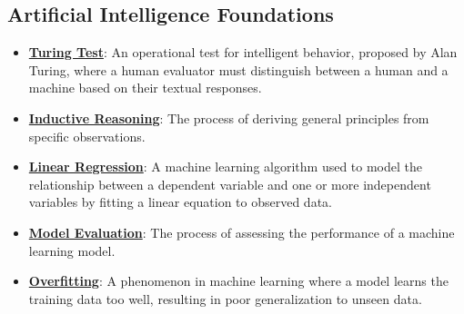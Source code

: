 \documentclass{article}%
\begin{document}
\subsection{Artificial Intelligence Foundations}%
\label{subsec:ArtificialIntelligenceFoundations}%
\begin{itemize}[leftmargin=*]%
\item \href{https://purdue.brightspace.com/d2l/common/assets/pdfjs-d2l-dist/1.0.14-legacy/web/viewer.html?file=\%2Fcontent\%2Fenforced\%2F1095467-wl.202510.CS.24300.001\%2F02L2-Intro.pdf\%3Fou\%3D1095467\&lang=en-us\&container=d2l-fileviewer-rendered-pdf\&fullscreen=d2l-fileviewer-rendered-pdf-dialog\&height=667#page=6}{\textbf{Turing Test}}: An operational test for intelligent behavior, proposed by Alan Turing, where a human evaluator must distinguish between a human and a machine based on their textual responses.%
\item \href{https://purdue.brightspace.com/d2l/common/assets/pdfjs-d2l-dist/1.0.14-legacy/web/viewer.html?file=\%2Fcontent\%2Fenforced\%2F1095467-wl.202510.CS.24300.001\%2F05L2-ML Basics.pdf\%3Fou\%3D1095467\&lang=en-us\&container=d2l-fileviewer-rendered-pdf\&fullscreen=d2l-fileviewer-rendered-pdf-dialog\&height=667#page=3}{\textbf{Inductive Reasoning}}: The process of deriving general principles from specific observations.%
\item \href{https://purdue.brightspace.com/d2l/common/assets/pdfjs-d2l-dist/1.0.14-legacy/web/viewer.html?file=\%2Fcontent\%2Fenforced\%2F1095467-wl.202510.CS.24300.001\%2F05L2-ML Basics.pdf\%3Fou\%3D1095467\&lang=en-us\&container=d2l-fileviewer-rendered-pdf\&fullscreen=d2l-fileviewer-rendered-pdf-dialog\&height=667#page=6}{\textbf{Linear Regression}}: A machine learning algorithm used to model the relationship between a dependent variable and one or more independent variables by fitting a linear equation to observed data.%
\item \href{https://purdue.brightspace.com/d2l/common/assets/pdfjs-d2l-dist/1.0.14-legacy/web/viewer.html?file=\%2Fcontent\%2Fenforced\%2F1095467-wl.202510.CS.24300.001\%2F05L2-ML Basics.pdf\%3Fou\%3D1095467\&lang=en-us\&container=d2l-fileviewer-rendered-pdf\&fullscreen=d2l-fileviewer-rendered-pdf-dialog\&height=667#page=8}{\textbf{Model Evaluation}}: The process of assessing the performance of a machine learning model.%
\item \href{https://purdue.brightspace.com/d2l/common/assets/pdfjs-d2l-dist/1.0.14-legacy/web/viewer.html?file=\%2Fcontent\%2Fenforced\%2F1095467-wl.202510.CS.24300.001\%2F05L2-ML Basics.pdf\%3Fou\%3D1095467\&lang=en-us\&container=d2l-fileviewer-rendered-pdf\&fullscreen=d2l-fileviewer-rendered-pdf-dialog\&height=667#page=14}{\textbf{Overfitting}}: A phenomenon in machine learning where a model learns the training data too well, resulting in poor generalization to unseen data.%

\end{itemize}
\end{document}
